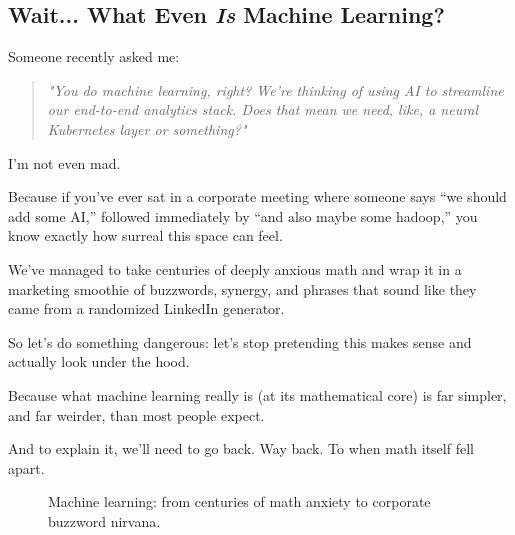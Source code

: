\subsection{Wait... What Even \textit{Is} Machine Learning?}

Someone recently asked me:

\begin{quote}
\textit{"You do machine learning, right? We’re thinking of using AI to streamline our end-to-end analytics stack. Does that mean we need, like, a neural Kubernetes layer or something?"}
\end{quote}

I'm not even mad.

Because if you’ve ever sat in a corporate meeting where someone says “we should add some AI,” followed immediately by “and also maybe some hadoop,” you know exactly how surreal this space can feel.

We’ve managed to take centuries of deeply anxious math and wrap it in a marketing smoothie of buzzwords, synergy, and phrases that sound like they came from a randomized LinkedIn generator.


So let’s do something dangerous: let’s stop pretending this makes sense and actually look under the hood.

Because what machine learning really is (at its mathematical core) is far simpler, and far weirder, than most people expect.

And to explain it, we’ll need to go back. Way back. To when math itself fell apart.

\begin{figure}[H]
\centering
{}
\caption{Machine learning: from centuries of math anxiety to corporate buzzword nirvana.}
\end{figure}
